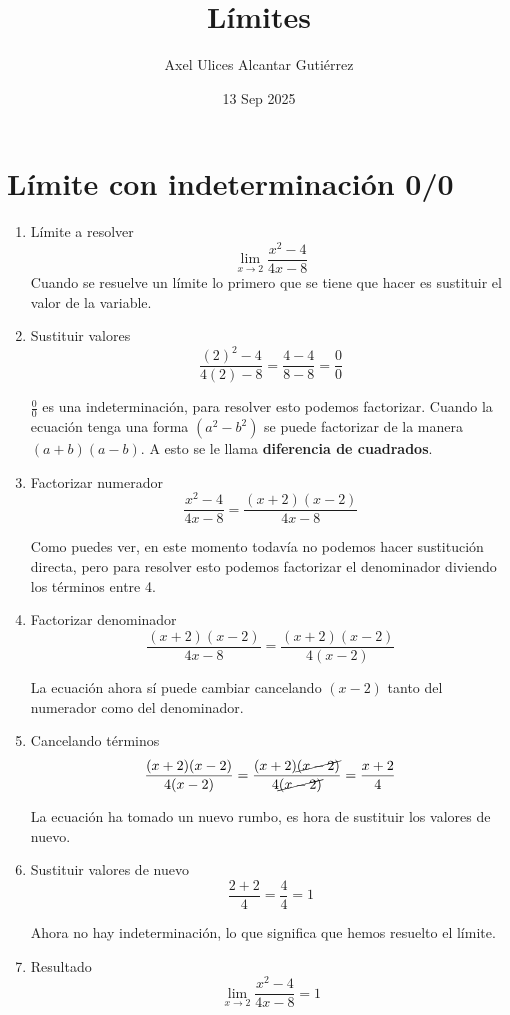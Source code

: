 \documentclass[a4paper,10pt]{article}
\title{Límites}
\author{Axel Ulices Alcantar Gutiérrez}
\date{13 Sep 2025}
\begin{document}
\maketitle

\section{Límite con indeterminación 0/0}

\begin{enumerate}
	\item Límite a resolver
	      \[
		      \lim_{x\to2}\frac{x^{2} - 4}{4x - 8}
	      \]
	      Cuando se resuelve un límite lo primero que se tiene que hacer es sustituir el valor de la variable.

	\item Sustituir valores
	      \[
		      \frac{(2)^{2} - 4}{4(2) - 8} = \frac{4 - 4}{8 - 8} = \frac{0}{0}
	      \]

	      $\frac{0}{0}$ es una indeterminación, para resolver esto podemos factorizar. Cuando la ecuación tenga una forma $(a^2 - b^2)$ se puede factorizar de la manera $(a + b)(a - b)$. A esto se le llama \textbf{diferencia de cuadrados}.

	\item Factorizar numerador
	      \[
		      \frac{x^{2} - 4}{4x - 8} = \frac{(x + 2)(x - 2)}{4x - 8}
	      \]

	      Como puedes ver, en este momento todavía no podemos hacer sustitución directa, pero para resolver esto podemos factorizar el denominador diviendo los términos entre 4.

	\item Factorizar denominador
	      \[
		      \frac{(x + 2)(x - 2)}{4x - 8} = \frac{(x + 2)(x - 2)}{4(x - 2)}
	      \]

	      La ecuación ahora sí puede cambiar cancelando $(x - 2)$ tanto del numerador como del denominador.

	\item Cancelando términos
	      \[
		      \frac{(x + 2)(x - 2)}{4(x - 2)} = \frac{(x + 2)\cancel{(x - 2)}}{4\cancel{(x - 2)}} = \frac{x + 2}{4}
	      \]

	      La ecuación ha tomado un nuevo rumbo, es hora de sustituir los valores de nuevo.

	\item Sustituir valores de nuevo
	      \[
		      \frac{2 + 2}{4} = \frac{4}{4} = 1
	      \]

	      Ahora no hay indeterminación, lo que significa que hemos resuelto el límite.

	\item Resultado
	      \[
		      \boxed{\lim_{x\to2}\frac{x^{2} - 4}{4x - 8} = 1}
	      \]

\end{enumerate}
\end{document}
